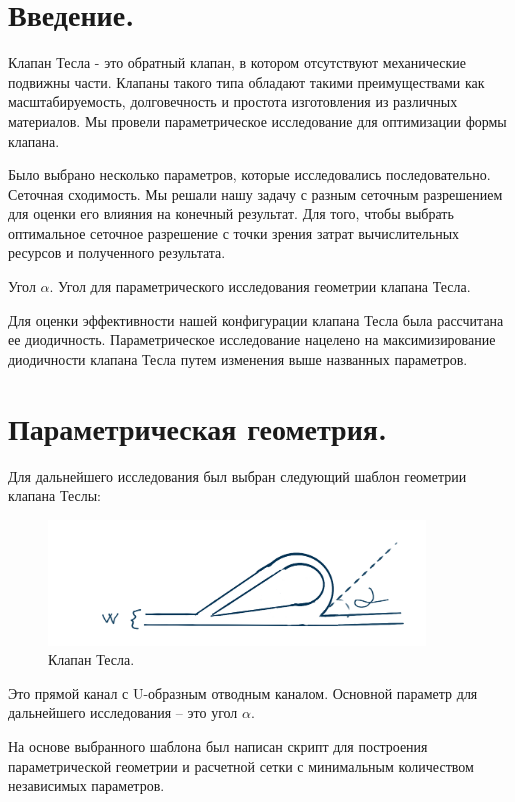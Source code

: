 \documentclass[14pt,a4paper]{article}
\begin{document}
    \section*{Введение.}
    
    Клапан Тесла - это обратный клапан, в котором отсутствуют механические подвижны части. Клапаны такого типа обладают такими преимуществами как масштабируемость, долговечность и простота изготовления из различных материалов. Мы провели параметрическое исследование для оптимизации формы клапана. 
    
    Было выбрано несколько параметров, которые исследовались последовательно.  Сеточная сходимость. Мы решали нашу задачу с разным сеточным разрешением для оценки его влияния на конечный результат. Для того, чтобы выбрать оптимальное сеточное разрешение с точки зрения затрат вычислительных ресурсов и полученного результата.
    
    Угол $\alpha$. Угол для параметрического исследования геометрии клапана Тесла.
    
    Для оценки эффективности нашей конфигурации клапана Тесла была рассчитана ее диодичность. Параметрическое исследование нацелено на максимизирование диодичности клапана Тесла путем изменения выше названных параметров.
    
    \section*{Параметрическая геометрия.}
        
        Для дальнейшего исследования был выбран следующий шаблон геометрии клапана Теслы:
        
        \begin{figure}[h!]
            \centering
            \includegraphics[width=100mm,scale=0.5]{teslaValve}
            \caption{Клапан Тесла.}
            \label{fig:TeslaValve}
        \end{figure}
        Это прямой канал с U-образным отводным каналом.
        Основной параметр для дальнейшего исследования -- это угол $ \alpha  $.
        
        На основе выбранного шаблона был написан скрипт для построения параметрической геометрии и расчетной сетки с минимальным количеством независимых параметров.
        
\end{document}
